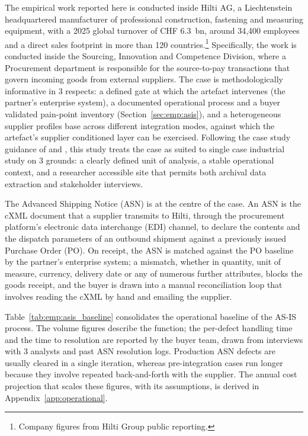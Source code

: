 The empirical work reported here is conducted inside Hilti AG, a Liechtenstein headquartered manufacturer of professional construction, fastening and measuring equipment, with a 2025 global turnover of CHF 6.3~bn, around 34{,}400 employees and a direct sales footprint in more than 120 countries.\footnote{Company figures from Hilti Group public reporting.} Specifically, the work is conducted inside the Sourcing, Innovation and Competence Division, where a Procurement department is responsible for the source-to-pay transactions that govern incoming goods from external suppliers. The case is methodologically informative in 3 respects: a defined gate at which the artefact intervenes (the partner’s enterprise system), a documented operational process and a buyer validated pain-point inventory (Section~\ref{sec:emp:asis}), and a heterogeneous supplier profiles base across different integration modes, against which the artefact's supplier conditioned layer can be exercised. Following the case study guidance of \citet{yin2018case} and \citet{runeson2009}, this study treats the case as suited to single case industrial study on 3 grounds: a clearly defined unit of analysis, a stable operational context, and a researcher accessible site that permits both archival data extraction and stakeholder interviews.

The Advanced Shipping Notice (ASN) is at the centre of the case. An ASN is the cXML document that a supplier transmits to Hilti, through the procurement platform's electronic data interchange (EDI) channel, to declare the contents and the dispatch parameters of an outbound shipment against a previously issued Purchase Order (PO). On receipt, the ASN is matched against the PO baseline by the partner's enterprise system; a mismatch, whether in quantity, unit of measure, currency, delivery date or any of numerous further attributes, blocks the goods receipt, and the buyer is drawn into a manual reconciliation loop that involves reading the cXML by hand and emailing the supplier.


Table~\ref{tab:emp:asis_baseline} consolidates the operational baseline of the AS-IS process. The volume figures describe the function; the per-defect handling time and the time to resolution are reported by the buyer team, drawn from interviews with 3 analysts and past ASN resolution logs. Production ASN defects are usually cleared in a single iteration, whereas pre-integration cases run longer because they involve repeated back-and-forth with the supplier. The annual cost projection that scales these figures, with its assumptions, is derived in Appendix~\ref{app:operational}.

